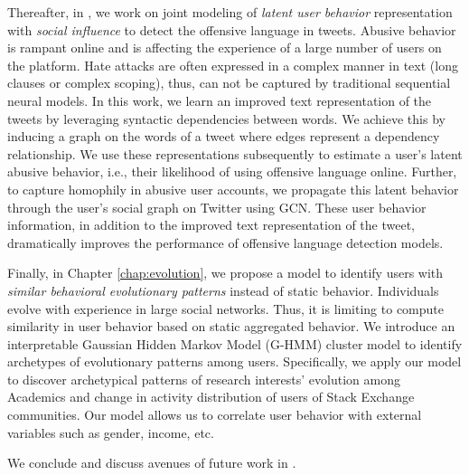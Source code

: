 Thereafter, in , we work on joint modeling of \emph{latent user behavior} representation with \emph{social influence} to detect the offensive language in tweets. Abusive behavior is rampant online and is affecting the experience of a large number of users on the platform. Hate attacks are often expressed in a complex manner in text (long clauses or complex scoping), thus, can not be captured by traditional sequential neural models.
In this work, we learn an improved text representation of the tweets %
by leveraging syntactic dependencies between words.
We achieve this by inducing a graph on the words of a tweet where edges represent a dependency relationship. We use these representations subsequently to estimate a user's latent abusive behavior, i.e., their likelihood of using offensive language online.
Further, to capture homophily in abusive user accounts, we propagate this latent behavior through the user's social graph on Twitter using GCN. These user behavior information, in addition to the improved text representation of the tweet, dramatically improves the performance of offensive language detection models.

Finally, in Chapter \ref{chap:evolution}, we propose a model to identify users with \emph{similar behavioral evolutionary patterns} instead of static behavior.
Individuals evolve with experience in large social networks. Thus, it is limiting to compute similarity in user behavior based on static aggregated behavior. We introduce an interpretable Gaussian Hidden Markov Model (G-HMM) cluster model to identify archetypes of evolutionary patterns among users.
Specifically, we apply our model to discover archetypical patterns of research interests' evolution among Academics and change in activity distribution of users of Stack Exchange communities. Our model allows us to correlate user behavior with external variables such as gender, income, etc.

We conclude and discuss avenues of future work in .




